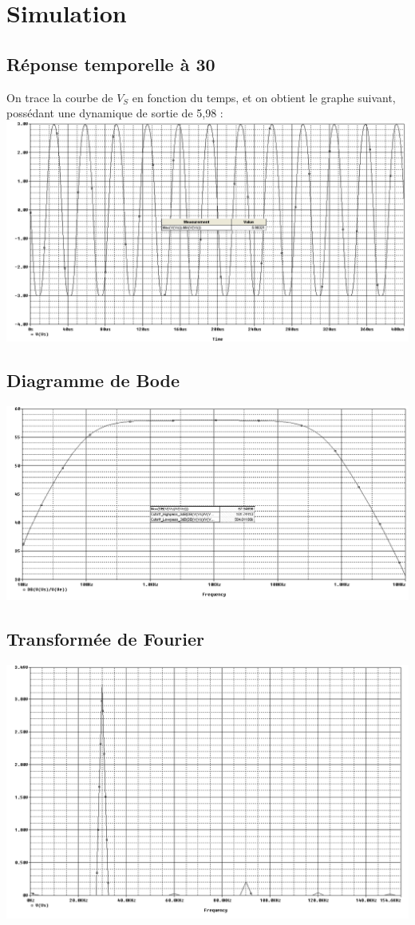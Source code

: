 \documentclass[11pt;a4paper]{report}
\begin{document}
  \section{Simulation}
   \subsection{Réponse temporelle à 30\kilo\hertz}
    On trace la courbe de $V_S$ en fonction du temps, et on obtient le graphe suivant, possédant une dynamique de sortie de 5,98 \volt :
    \includegraphics[width=18cm]{images/reponse_temporelle}
    
   \subsection{Diagramme de Bode}
    \includegraphics[width=18cm]{images/bode}

   \subsection{Transformée de Fourier}
    \includegraphics[width=18cm]{images/fft}
\end{document}
